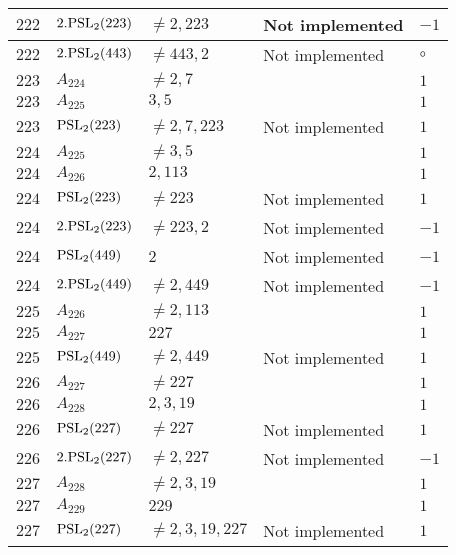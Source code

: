 \documentclass[a4paper, 11pt]{article}
\begin{document}
\begin{longtable}{lllll}
        $ 222 $ & $ 2.{\rm PSL}_{2}(223) $ & $ \neq 2, 223 $ & Not implemented & $ -1  $ \\ \hline
        $ 222 $ & $ 2.{\rm PSL}_{2}(443) $ & $ \neq 443, 2 $ & Not implemented & $\circ$ \\ \hline
        $ 223 $ & $ A_{224} $ & $ \neq 2, 7 $ & $ ~ $ & $ 1  $ \\ \hline
        $ 223 $ & $ A_{225} $ & $ 3, 5 $ & $ ~ $ & $ 1  $ \\ \hline
        $ 223 $ & $ {\rm PSL}_{2}(223) $ & $ \neq 2, 7, 223 $ & Not implemented & $ 1  $ \\ \hline
        $ 224 $ & $ A_{225} $ & $ \neq 3, 5 $ & $ ~ $ & $ 1  $ \\ \hline
        $ 224 $ & $ A_{226} $ & $ 2, 113 $ & $ ~ $ & $ 1  $ \\ \hline
        $ 224 $ & $ {\rm PSL}_{2}(223) $ & $ \neq 223 $ & Not implemented & $ 1  $ \\ \hline
        $ 224 $ & $ 2.{\rm PSL}_{2}(223) $ & $ \neq 223, 2 $ & Not implemented & $ -1  $ \\ \hline
        $ 224 $ & $ {\rm PSL}_{2}(449) $ & $ 2 $ & Not implemented & $ -1  $ \\ \hline
        $ 224 $ & $ 2.{\rm PSL}_{2}(449) $ & $ \neq 2, 449 $ & Not implemented & $ -1  $ \\ \hline
        $ 225 $ & $ A_{226} $ & $ \neq 2, 113 $ & $ ~ $ & $ 1  $ \\ \hline
        $ 225 $ & $ A_{227} $ & $ 227 $ & $ ~ $ & $ 1  $ \\ \hline
        $ 225 $ & $ {\rm PSL}_{2}(449) $ & $ \neq 2, 449 $ & Not implemented & $ 1  $ \\ \hline
        $ 226 $ & $ A_{227} $ & $ \neq 227 $ & $ ~ $ & $ 1  $ \\ \hline
        $ 226 $ & $ A_{228} $ & $ 2, 3, 19 $ & $ ~ $ & $ 1  $ \\ \hline
        $ 226 $ & $ {\rm PSL}_{2}(227) $ & $ \neq 227 $ & Not implemented & $ 1  $ \\ \hline
        $ 226 $ & $ 2.{\rm PSL}_{2}(227) $ & $ \neq 2, 227 $ & Not implemented & $ -1  $ \\ \hline
        $ 227 $ & $ A_{228} $ & $ \neq 2, 3, 19 $ & $ ~ $ & $ 1  $ \\ \hline
        $ 227 $ & $ A_{229} $ & $ 229 $ & $ ~ $ & $ 1  $ \\ \hline
        $ 227 $ & $ {\rm PSL}_{2}(227) $ & $ \neq 2, 3, 19, 227 $ & Not implemented & $ 1  $ \\ \hline

\end{longtable}
\end{document}
